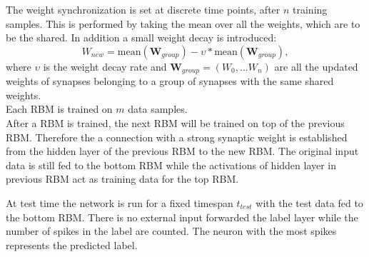 The weight synchronization is set at discrete time points, after $n$ training samples.
This is performed by taking the mean over all the weights, which are to be the shared.
In addition a small weight decay is introduced:
\[
W_{new} = \text{mean}(\textbf{W}_{group}) - \upsilon * \text{mean}(\textbf{W}_{group}) , 
\]
where $\upsilon$ is the weight decay rate and $\textbf{W}_{group} = (W_0 ,... W_n)$ are all the updated weights of synapses belonging to a group of synapses with the same shared weights.
\\
Each RBM is trained on $m$ data samples.
\\
After a RBM is trained, the next RBM will be trained on top of the previous RBM.
Therefore the a connection with a strong synaptic weight is established from the hidden layer of the previous RBM to the new RBM.
The original input data is still fed to the bottom RBM while the activations of hidden layer in previous RBM act as training data for the top RBM.


At test time the network is run for a fixed timespan $t_{test}$ with the test data fed to the bottom RBM.
There is no external input forwarded the label layer while the number of spikes in the label are counted.
The neuron with the most spikes represents the predicted label.  

 
